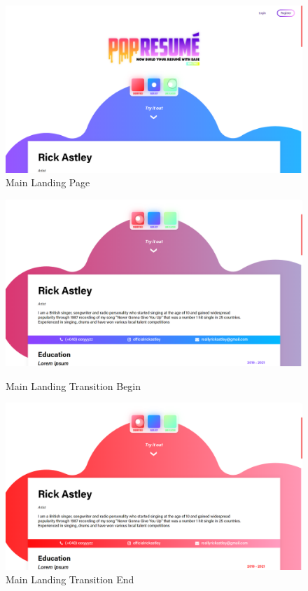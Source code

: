 \documentclass[12pt]{article}
\begin{document}
\begin{figure}[H]
\centering
\includegraphics[width=0.7\linewidth]{Screenshot (123).png}
\caption{Main Landing Page}
\end{figure}
\begin{figure}[H]
    \begin{minipage}{0.47\textwidth}
        \centering
        \includegraphics[width=\linewidth]{Screenshot (124).png}
        \caption{Main Landing Transition Begin}
    \end{minipage}\hfill
    \begin{minipage}{0.47\textwidth}
        \centering
        \includegraphics[width=\linewidth]{Screenshot (125).png}
        \caption{Main Landing Transition End}
    \end{minipage}
\end{figure}
\end{document}
